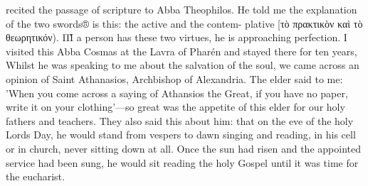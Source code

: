 recited the passage of scripture to Abba Theophilos. He told me the
explanation of the two swords® is this: the active and the contem-
plative [τὸ πρακτικὸν καὶ τὸ θεωρητικόν). ΠῚ a person
has these two virtues, he is approaching perfection. I visited this
Abba Cosmas at the Lavra of Pharén and stayed there for ten
years, Whilst he was speaking to me about the salvation of the soul,
we came across an opinion of Saint Athanasios, Archbishop of
Alexandria. The elder said to me: 'When you come across a saying
of Athansios the Great, if you have no paper, write it on your
clothing'—so great was the appetite of this elder for our holy fathers
and teachers. They also said this about him: that on the eve of the
holy Lord\textquotesingle s Day, he would stand from vespers to dawn singing and
reading, in his cell or in church, never sitting down at all. Once the
sun had risen and the appointed service had been sung, he would sit
reading the holy Gospel until it was time for the eucharist.

